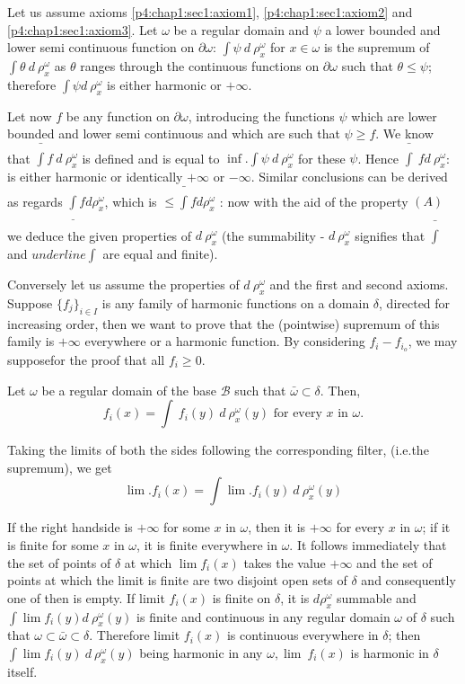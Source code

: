 Let us assume axioms \ref{p4:chap1:sec1:axiom1},
\ref{p4:chap1:sec1:axiom2} 
and \ref{p4:chap1:sec1:axiom3}. Let $\omega$ be a regular domain
and $\psi$ a lower bounded and lower semi continuous function on
$\partial\omega$: $\int \psi ~ d ~ \rho^\omega_x$ for $x \in \omega$
is the supremum of $\int \theta ~ d ~ \rho^\omega_x$ as $\theta$
ranges through the continuous functions on $\partial \omega$ such that
$\theta \le\psi$; therefore $\int \psi d ~ \rho^\omega_x$ is either
harmonic or $+ \infty$. 

Let now $f$ be any function on $\partial \omega$, introducing the
functions $\psi$ which are lower bounded and lower semi continuous and
which are such that $\psi \ge f$. We know that $\bar{\int} f ~ d ~
\rho^\omega_x $ is defined and is equal to $\inf. \int \psi~ d
~\rho^\omega_x$ for these $\psi$. Hence $\bar{\int} ~ fd ~
\rho^\omega_x$: is either harmonic or identically $+ \infty$ or $-
\infty$. Similar conclusions can be derived as regards
$\underline{\int} f d \rho^\omega_x$, which is $\leq \bar{\int} f d
\rho^\omega_x$ : now with the aid of the property $(A)$ we deduce the
given properties of $d ~ \rho^\omega_x$ (the summability - $d ~
\rho^\omega_x$ signifies that $\bar{\int}$ and $underline{\int}$ are equal and
finite). 

Conversely let us assume the properties of $d ~ \rho_x^\omega$ and the
first and second axioms. Suppose $\{ f_j\}_{i \in I}$ is any family of
harmonic functions on a domain $\delta$, directed for increasing
order, then we want to prove that the (pointwise) supremum of this
family is $+ \infty$ everywhere or a harmonic function. By considering
$f_i - f_{i_o}$, we may suppose\pageoriginale for the proof that all $f_i \ge 0$. 

Let $\omega$ be a regular domain of the base $\mathscr{B}$ such that
$\bar{\omega} \subset \delta$. Then,  
$$
f_i(x) = \int ~ f_i (y) ~ d ~ \rho^\omega_x (y) \text{ for every } x
\text{ in } \omega. 
$$

Taking the limits of both the sides following the corresponding
filter, (i.e.the supremum), we get 
$$
\lim.  f_i (x) = \int \lim.f_i(y) ~ d ~ \rho^\omega_x(y)
$$

If the right handside is $+ \infty$ for some $x$ in $\omega$, then it
is $+ \infty$ for every $x$ in $\omega$; if it is finite for some $x$
in $\omega$, it is finite everywhere in $\omega$. It follows
immediately that the set of points of $\delta$ at which $\lim f_i(x)$
takes the value $+ \infty$ and the set of points at which the limit is
finite are two disjoint open sets of $\delta$ and consequently one of
then is empty. If limit $f_i(x)$ is finite on $\delta$, it is $d
\rho^\omega_x$ summable and $\int \lim f_i(y)d ~ \rho^\omega_x(y)$ is
finite and continuous in any regular domain $\omega$ of $\delta$ such
that $\omega \subset \bar{\omega} \subset \delta$. Therefore limit
$f_i(x)$ is continuous everywhere in $\delta$; then $\int \lim f_i
(y) ~ d ~ \rho^\omega_x(y)$ being harmonic in any $\omega, \lim ~
f_i(x)$  is harmonic in $\delta$ itself. 

